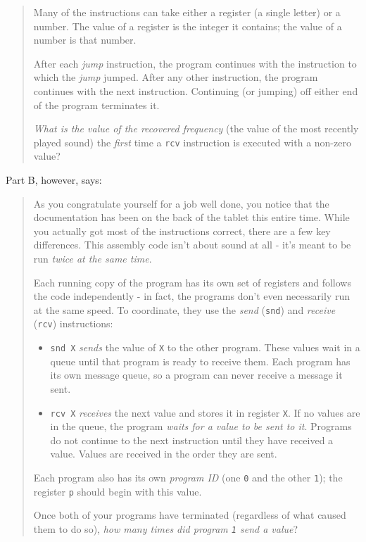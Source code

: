 \documentclass[]{article}
\begin{document}
\begin{quote}
Many of the instructions can take either a register (a single letter) or a
number. The value of a register is the integer it contains; the value of a
number is that number.

After each \emph{jump} instruction, the program continues with the instruction
to which the \emph{jump} jumped. After any other instruction, the program
continues with the next instruction. Continuing (or jumping) off either end of
the program terminates it.

\emph{What is the value of the recovered frequency} (the value of the most
recently played sound) the \emph{first} time a \texttt{rcv} instruction is
executed with a non-zero value?
\end{quote}

Part B, however, says:

\begin{quote}
As you congratulate yourself for a job well done, you notice that the
documentation has been on the back of the tablet this entire time. While you
actually got most of the instructions correct, there are a few key differences.
This assembly code isn't about sound at all - it's meant to be run \emph{twice
at the same time}.

Each running copy of the program has its own set of registers and follows the
code independently - in fact, the programs don't even necessarily run at the
same speed. To coordinate, they use the \emph{send} (\texttt{snd}) and
\emph{receive} (\texttt{rcv}) instructions:

\begin{itemize}
\tightlist
\item
  \texttt{snd\ X} \emph{sends} the value of \texttt{X} to the other program.
  These values wait in a queue until that program is ready to receive them. Each
  program has its own message queue, so a program can never receive a message it
  sent.
\item
  \texttt{rcv\ X} \emph{receives} the next value and stores it in register
  \texttt{X}. If no values are in the queue, the program \emph{waits for a value
  to be sent to it}. Programs do not continue to the next instruction until they
  have received a value. Values are received in the order they are sent.
\end{itemize}

Each program also has its own \emph{program ID} (one \texttt{0} and the other
\texttt{1}); the register \texttt{p} should begin with this value.

Once both of your programs have terminated (regardless of what caused them to do
so), \emph{how many times did program \texttt{1} send a value}?
\end{quote}
\end{document}
